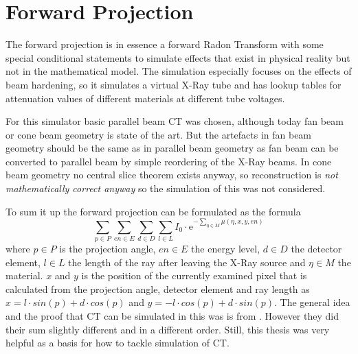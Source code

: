 \section{Forward Projection}
\par The forward projection is in essence a forward Radon Transform with some special conditional statements to simulate effects that exist in physical reality but not in the mathematical model. The simulation especially focuses on the effects of beam hardening, so it simulates a virtual X-Ray tube and has lookup tables for attenuation values of different materials at different tube voltages.
\par For this simulator basic parallel beam CT was chosen, although today fan beam or cone beam geometry is state of the art. But the artefacts in fan beam geometry should be the same as in parallel beam geometry as fan beam can be converted to parallel beam by simple reordering of the X-Ray beams.\cite{IIIP_3_4} In cone beam geometry no central slice theorem exists anyway, so reconstruction is \emph{not mathematically correct anyway} so the simulation of this was not considered\cite{IIIP_3_5}.
\par To sum it up the forward projection can be formulated as the formula\[\sum_{p\in P}\sum_{en\in E}\sum_{d \in D}\sum_{l \in L}I_{0}\cdot \textrm{e}^{-\sum_{\eta \in M}\mu(\eta,x,y,en)}\] where \(p\in P\) is the projection angle, \(en\in E\) the energy level, \(d \in D\) the detector element, \(l \in L\) the length of the ray after leaving the X-Ray source and \(\eta \in M\) the material. \(x\) and \(y\) is the position of the currently examined pixel that is calculated from the projection angle, detector element and ray length as \(x = l\cdot sin(p) + d\cdot cos(p)\) and \(y = -l\cdot cos(p) + d\cdot sin(p)\). The general idea and the proof that CT can be simulated in this was is from \cite{deMan}. However they did their sum slightly different and in a different order. Still, this thesis was very helpful as a basis for how to tackle simulation of CT.
